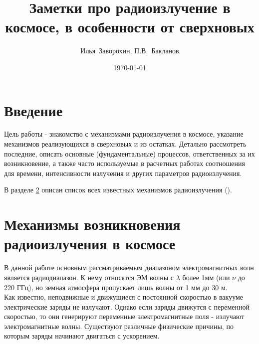 \documentclass[a4paper,12pt]{extarticle}
\begin{document}
\title{\large
 Заметки про радиоизлучение в космосе, в особенности от сверхновых
}

\author{Илья~Заворохин, П.В.~Бакланов}

\date{\today}

\maketitle

\tableofcontents
\clearpage




\section{Введение}
    Цель работы - знакомство с механизмами радиоизлучения в космосе, указание механизмов реализующихся в сверхновых и из остатках. Детально рассмотреть последние, описать основные (фундаментальные) процессов, ответственных за их возникновение, а также часто используемые в расчетных работах соотношения для времени, интенсивности излучения и других параметров радиоизлучения.

    В разделе \ref{sec: list_radioemissions} описан список всех известных механизмов радиоизлучения ().

    

\section{Механизмы возникновения радиоизлучения в космосе} \label{sec: list_radioemissions}
В данной работе основным рассматриваемым диапазоном электромагнитных волн является радиодиапазон.
К нему относятся ЭМ волны с $\lambda$ более 1мм (или $\nu$ до 220 ГГц), но земная атмосфера пропускает лишь волны от 1 мм до 30 м. \cite{elementyRadioMicro, Levin2009} \\
Как известно, неподвижные и движущиеся с постоянной скоростью в вакууме электрические заряды не излучают. Однако если заряды движутся с переменной скоростью, то они генерируют переменные электромагнитные поля - излучают электромагнитные волны. Существуют различные физические причины, по которым заряды начинают двигаться с ускорением. {\cite{Kaplan1966,GFF1983}}
\end{document}
